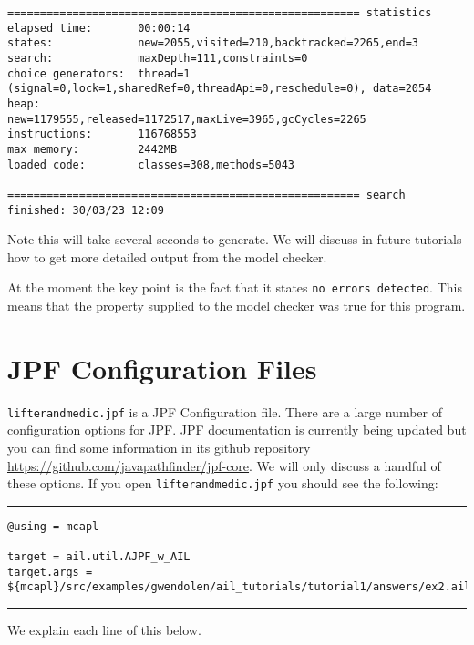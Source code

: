 \begin{verbatim}
====================================================== statistics
elapsed time:       00:00:14
states:             new=2055,visited=210,backtracked=2265,end=3
search:             maxDepth=111,constraints=0
choice generators:  thread=1 (signal=0,lock=1,sharedRef=0,threadApi=0,reschedule=0), data=2054
heap:               new=1179555,released=1172517,maxLive=3965,gcCycles=2265
instructions:       116768553
max memory:         2442MB
loaded code:        classes=308,methods=5043

====================================================== search finished: 30/03/23 12:09
\end{verbatim}

Note this will take several seconds to generate.  We will discuss in future tutorials how to get more detailed output from the model checker.

At the moment the key point is the fact that it states \texttt{no errors detected}.  This means that the property supplied to the model checker was true for this program.

\section{JPF Configuration Files}

\texttt{lifterandmedic.jpf} is a JPF Configuration file.  There are a large number of configuration options for JPF.  JPF documentation is currently being updated but you can find some information in its github repository \url{https://github.com/javapathfinder/jpf-core}.  We will only discuss a handful of these options.  If you open \texttt{lifterandmedic.jpf} you should see the following:

\noindent\rule{\textwidth}{1pt}
\begin{small}
\begin{verbatim}
@using = mcapl

target = ail.util.AJPF_w_AIL
target.args = ${mcapl}/src/examples/gwendolen/ail_tutorials/tutorial1/answers/ex2.ail,${mcapl}/src/examples/gwendolen/ajpf_tutorials/tutorial1/lifterandmedic.psl,1

\end{verbatim}
\end{small}
\rule{\textwidth}{1pt}

We explain each line of this below.

